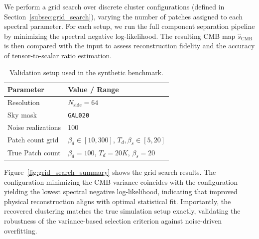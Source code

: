 \documentclass[%
 reprint,
bibnotes,
 amsmath,amssymb,
 aps,
floatfix, 
]{revtex4-2}
\begin{document}
We perform a grid search over discrete cluster configurations (defined in Section~\ref{subsec:grid_search}), varying the number of patches assigned to each spectral parameter. For each setup, we run the full component separation pipeline by minimizing the spectral negative log-likelihood. The resulting CMB map \( \hat{s}_{\mathrm{CMB}} \) is then compared with the input to assess reconstruction fidelity and the accuracy of tensor-to-scalar ratio estimation.

\begin{table}[h]
    \centering
    \small
    \caption{Validation setup used in the synthetic benchmark.}
    \label{tab:validation_config}
    \begin{tabular}{@{}p{3.5cm}|p{4.5cm}@{}}
        \toprule
        \textbf{Parameter} & \textbf{Value / Range}  \\
        \midrule
        Resolution & \( N_{\text{side}} = 64 \) \\
        Sky mask & \texttt{GAL020}  \\
        Noise realizations & 100  \\
        Patch count grid & \( \beta_d \in [10, 300] \), \( T_d, \beta_s \in [5, 20] \) \\
        True  Patch count & \( \beta_d = 100 \), \( T_d = 20 K \), \( \beta_s = 20\) \\
        \bottomrule
    \end{tabular}
\end{table}


Figure~\ref{fig:grid_search_summary} shows the grid search results. The configuration minimizing the CMB variance coincides with the configuration yielding the lowest spectral negative log-likelihood, indicating that improved physical reconstruction aligns with optimal statistical fit. Importantly, the recovered clustering matches the true simulation setup exactly, validating the robustness of the variance-based selection criterion against noise-driven overfitting.
\end{document}
